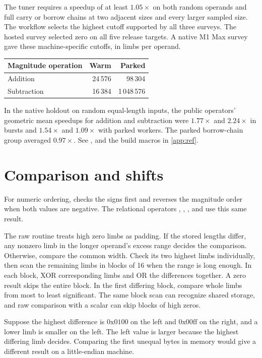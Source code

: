 The tuner requires a speedup of at least $1.05\times$ on both random operands and
full carry or borrow chains at two adjacent sizes and every larger sampled size.
The workflow selects the highest cutoff supported by all three surveys. The hosted
survey selected zero on all five release targets. A native M1 Max survey gave
these machine-specific cutoffs, in limbs per operand.

\begin{center}
\small
\begin{tabular}{lrr}
\toprule
Magnitude operation & Warm & Parked \\
\midrule
Addition    & 24\,576 & 98\,304 \\
Subtraction & 16\,384 & 1\,048\,576 \\
\bottomrule
\end{tabular}
\end{center}

In the native holdout on random equal-length inputs, the public operators' geometric
mean speedups for addition and subtraction were $1.77\times$ and $2.24\times$ in
bursts and $1.54\times$ and $1.09\times$ with parked workers. The parked borrow-chain
group averaged $0.97\times$. See , 
and the build macros in \cref{app:ref}.

\newpage
\section{Comparison and shifts}

For numeric ordering,  checks the signs first and reverses
the magnitude order when both values are negative. The relational operators
\code{>}, \code{>=}, \code{<}, and \code{<=} use this same result.

The raw  routine treats high zero limbs as padding. If the
stored lengths differ, any nonzero limb in the longer operand's excess
range decides the comparison. Otherwise, compare the common width. Check
its two highest limbs individually, then scan the remaining limbs in
blocks of 16 when the range is long enough. In each block, XOR corresponding
limbs and OR the differences together. A zero result skips the entire block.
In the first differing block, compare whole limbs from most to least
significant. The same block scan can recognize shared storage, and raw
comparison with a scalar can skip blocks of high zeros.

\begin{example}
Suppose the highest difference is $0\mathrm{x}0100$ on the left and
$0\mathrm{x}00\mathrm{ff}$ on the right, and a lower limb is smaller on
the left. The left value is larger because the highest differing limb
decides. Comparing the first unequal bytes in memory would give a
different result on a little-endian machine.
\end{example}

